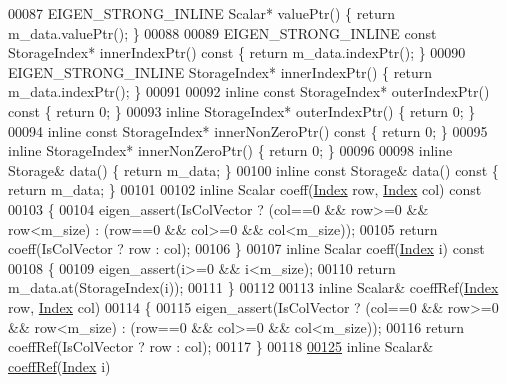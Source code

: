 \begin{DoxyCode}
00087     EIGEN\_STRONG\_INLINE Scalar* valuePtr() \{ \textcolor{keywordflow}{return} m\_data.valuePtr(); \}
00088 
00089     EIGEN\_STRONG\_INLINE \textcolor{keyword}{const} StorageIndex* innerIndexPtr()\textcolor{keyword}{ const }\{ \textcolor{keywordflow}{return} m\_data.indexPtr(); \}
00090     EIGEN\_STRONG\_INLINE StorageIndex* innerIndexPtr() \{ \textcolor{keywordflow}{return} m\_data.indexPtr(); \}
00091 
00092     \textcolor{keyword}{inline} \textcolor{keyword}{const} StorageIndex* outerIndexPtr()\textcolor{keyword}{ const }\{ \textcolor{keywordflow}{return} 0; \}
00093     \textcolor{keyword}{inline} StorageIndex* outerIndexPtr() \{ \textcolor{keywordflow}{return} 0; \}
00094     \textcolor{keyword}{inline} \textcolor{keyword}{const} StorageIndex* innerNonZeroPtr()\textcolor{keyword}{ const }\{ \textcolor{keywordflow}{return} 0; \}
00095     \textcolor{keyword}{inline} StorageIndex* innerNonZeroPtr() \{ \textcolor{keywordflow}{return} 0; \}
00096     
00098     \textcolor{keyword}{inline} Storage& data() \{ \textcolor{keywordflow}{return} m\_data; \}
00100     \textcolor{keyword}{inline} \textcolor{keyword}{const} Storage& data()\textcolor{keyword}{ const }\{ \textcolor{keywordflow}{return} m\_data; \}
00101 
00102     \textcolor{keyword}{inline} Scalar coeff(\hyperlink{namespace_eigen_a62e77e0933482dafde8fe197d9a2cfde}{Index} row, \hyperlink{namespace_eigen_a62e77e0933482dafde8fe197d9a2cfde}{Index} col)\textcolor{keyword}{ const}
00103 \textcolor{keyword}{    }\{
00104       eigen\_assert(IsColVector ? (col==0 && row>=0 && row<m\_size) : (row==0 && col>=0 && col<m\_size));
00105       \textcolor{keywordflow}{return} coeff(IsColVector ? row : col);
00106     \}
00107     \textcolor{keyword}{inline} Scalar coeff(\hyperlink{namespace_eigen_a62e77e0933482dafde8fe197d9a2cfde}{Index} i)\textcolor{keyword}{ const}
00108 \textcolor{keyword}{    }\{
00109       eigen\_assert(i>=0 && i<m\_size);
00110       \textcolor{keywordflow}{return} m\_data.at(StorageIndex(i));
00111     \}
00112 
00113     \textcolor{keyword}{inline} Scalar& coeffRef(\hyperlink{namespace_eigen_a62e77e0933482dafde8fe197d9a2cfde}{Index} row, \hyperlink{namespace_eigen_a62e77e0933482dafde8fe197d9a2cfde}{Index} col)
00114     \{
00115       eigen\_assert(IsColVector ? (col==0 && row>=0 && row<m\_size) : (row==0 && col>=0 && col<m\_size));
00116       \textcolor{keywordflow}{return} coeffRef(IsColVector ? row : col);
00117     \}
00118 
\hyperlink{group___sparse_core___module_a4b1845ada6ae59dd7afe361e30136ace}{00125}     \textcolor{keyword}{inline} Scalar& \hyperlink{group___sparse_core___module_a4b1845ada6ae59dd7afe361e30136ace}{coeffRef}(\hyperlink{group___core___module_a554f30542cc2316add4b1ea0a492ff02}{Index} i)

\end{DoxyCode}
